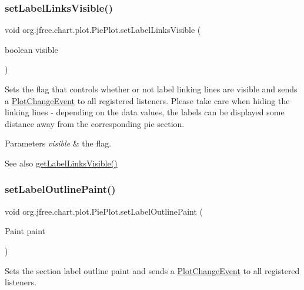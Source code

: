 \subsubsection{\texorpdfstring{set\+Label\+Links\+Visible()}{setLabelLinksVisible()}}
{\footnotesize\ttfamily void org.\+jfree.\+chart.\+plot.\+Pie\+Plot.\+set\+Label\+Links\+Visible (\begin{DoxyParamCaption}\item[{boolean}]{visible }\end{DoxyParamCaption})}

Sets the flag that controls whether or not label linking lines are visible and sends a \mbox{\hyperlink{}{Plot\+Change\+Event}} to all registered listeners. Please take care when hiding the linking lines -\/ depending on the data values, the labels can be displayed some distance away from the corresponding pie section.


\begin{DoxyParams}{Parameters}
{\em visible} & the flag.\\
\hline
\end{DoxyParams}
\begin{DoxySeeAlso}{See also}
\mbox{\hyperlink{classorg_1_1jfree_1_1chart_1_1plot_1_1_pie_plot_a61d0861c1429acfa06aa1e7a03fb877c}{get\+Label\+Links\+Visible()}} 
\end{DoxySeeAlso}
\mbox{\label{classorg_1_1jfree_1_1chart_1_1plot_1_1_pie_plot_a16e60b06f3dd0138ff6a81fa8b94c30f}} 
\subsubsection{\texorpdfstring{set\+Label\+Outline\+Paint()}{setLabelOutlinePaint()}}
{\footnotesize\ttfamily void org.\+jfree.\+chart.\+plot.\+Pie\+Plot.\+set\+Label\+Outline\+Paint (\begin{DoxyParamCaption}\item[{Paint}]{paint }\end{DoxyParamCaption})}

Sets the section label outline paint and sends a \mbox{\hyperlink{}{Plot\+Change\+Event}} to all registered listeners.


